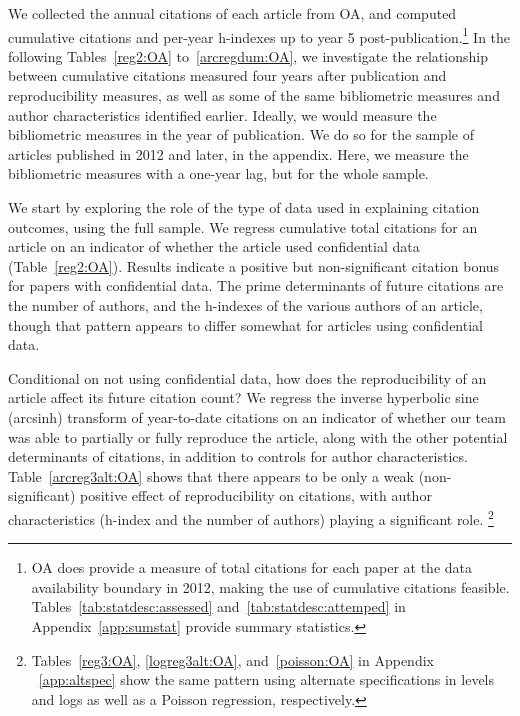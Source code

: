 We collected the annual citations of each article from OA, and computed cumulative citations and per-year h-indexes up to year 5 post-publication.\footnote{OA does provide a measure of total citations for each paper at the data availability boundary in 2012, making the use of cumulative citations feasible. Tables~\ref{tab:statdesc:assessed} and~\ref{tab:statdesc:attemped} in Appendix~\ref{app:sumstat} provide summary statistics.} 
%
In the following Tables~\ref{reg2:OA} to~\ref{arcregdum:OA}, we investigate the relationship between cumulative citations measured four years after publication and reproducibility measures, as well as some of the same bibliometric measures and author characteristics identified earlier. Ideally, we would measure the bibliometric measures in the year of publication. We do so for the sample of articles published in 2012 and later, in the appendix. Here, we measure the bibliometric measures with a one-year lag, but for the whole sample.


We start by exploring the role of the type of data used in explaining citation outcomes, using the full sample. We regress cumulative total citations for an article on an indicator of whether the article used confidential data (Table~\ref{reg2:OA}). Results indicate a positive but non-significant citation bonus for papers with confidential data. The prime determinants of future citations are the number of authors, and the h-indexes of the various authors of an article, though that pattern appears to differ somewhat for articles using confidential data. 



Conditional on not using confidential data, how does the reproducibility of an article affect its future citation count? We regress  the inverse hyperbolic sine (arcsinh) transform of year-to-date citations on an indicator of whether our team was able to partially or fully reproduce the article, along with the other potential determinants of citations, in addition to controls for author characteristics. Table~\ref{arcreg3alt:OA} shows that there appears to be only a weak (non-significant) positive effect of reproducibility on citations, with author characteristics (h-index and the number of authors) playing a significant role.%
%
\footnote{Tables~\ref{reg3:OA}, \ref{logreg3alt:OA},  and~\ref{poisson:OA} in Appendix ~\ref{app:altspec}  show the same pattern using alternate specifications in levels and logs as well as a Poisson regression, respectively.}
%


